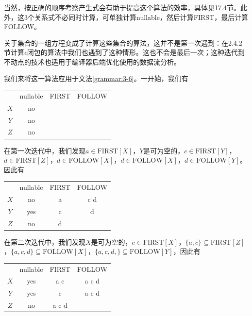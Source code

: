 \documentclass[cn,11pt,chinese]{elegantbook}
\begin{document}
当然，按正确的顺序考察产生式会有助于提高这个算法的效率，具体见17.4节。此外，这3个关系式不必同时计算，可单独计算nullable，然后计算FIRST，最后计算FOLLOW。

关于集合的一组方程变成了计算这些集合的算法，这并不是第一次遇到：在2.4.2节计算$\epsilon$闭包的算法中我们也遇到了这种情形。这也不会是最后一次；这种迭代到不动点的技术也适用于编译器后端优化使用的数据流分析。

我们来将这一算法应用于文法\ref{grammar:3-6}。一开始，我们有

\begin{center}
  \begin{tabular}{c|ccc}
    \multicolumn{1}{c}{} & nullable & FIRST & FOLLOW \\
    \cline{2-4}
    $X$ & no & & \\
    $Y$ & no & & \\
    $Z$ & no & & \\
  \end{tabular}
\end{center}

在第一次迭代中，我们发现$a\in\text{FIRST}[X]$，$Y$是可为空的，$c\in\text{FIRST}[Y]$，$d\in\text{FIRST}[Z]$，$d\in\text{FOLLOW}[X]$，$d\in\text{FOLLOW}[X]$，$d\in\text{FOLLOW}[Y]$。因此有

\begin{center}
  \begin{tabular}{c|ccc}
    \multicolumn{1}{c}{} & nullable & FIRST & FOLLOW \\
    \cline{2-4}
    $X$ & no & a & c \; d \\
    $Y$ & yes & c & d \\
    $Z$ & no & d & \\
  \end{tabular}
\end{center}

在第二次迭代中，我们发现$X$是可为空的，$c\in\text{FIRST}[X]$，$\{a,c\}\subseteq\text{FIRST}[Z]$，$\{a,c,d\}\subseteq\text{FOLLOW}[X]$，$\{a,c,d,\}\subseteq\text{FOLLOW}[Y]$，因此有

\begin{center}
  \begin{tabular}{c|ccc}
    \multicolumn{1}{c}{} & nullable & FIRST & FOLLOW \\
    \cline{2-4}
    $X$ & yes & a \; c& a \; c \; d \\
    $Y$ & yes & c & a \; c \; d \\
    $Z$ & no & a \; c \; d & \\
  \end{tabular}
\end{center}
\end{document}
